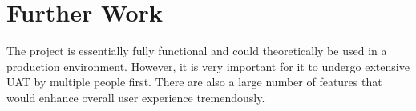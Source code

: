 \chapter{Further Work}
The project is essentially fully functional and could theoretically be used in a production environment. However, it is very important for it to undergo extensive UAT by multiple people first. There are also a large number of features that would enhance overall user experience tremendously. 